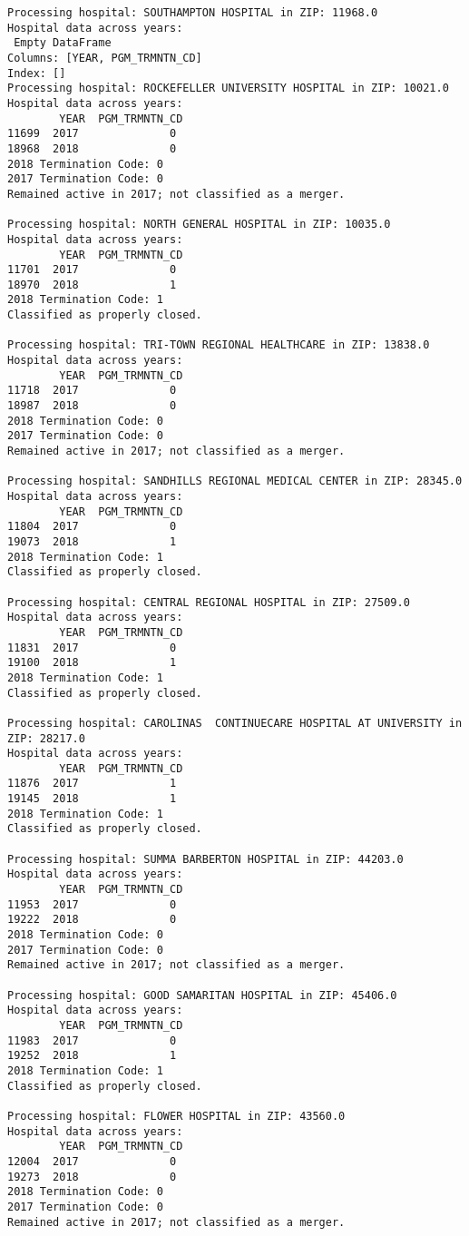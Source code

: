 \documentclass[
  letterpaper,
  DIV=11,
  numbers=noendperiod]{scrartcl}
\begin{document}
\begin{verbatim}
Processing hospital: SOUTHAMPTON HOSPITAL in ZIP: 11968.0
Hospital data across years:
 Empty DataFrame
Columns: [YEAR, PGM_TRMNTN_CD]
Index: []
Processing hospital: ROCKEFELLER UNIVERSITY HOSPITAL in ZIP: 10021.0
Hospital data across years:
        YEAR  PGM_TRMNTN_CD
11699  2017              0
18968  2018              0
2018 Termination Code: 0
2017 Termination Code: 0
Remained active in 2017; not classified as a merger.

Processing hospital: NORTH GENERAL HOSPITAL in ZIP: 10035.0
Hospital data across years:
        YEAR  PGM_TRMNTN_CD
11701  2017              0
18970  2018              1
2018 Termination Code: 1
Classified as properly closed.

Processing hospital: TRI-TOWN REGIONAL HEALTHCARE in ZIP: 13838.0
Hospital data across years:
        YEAR  PGM_TRMNTN_CD
11718  2017              0
18987  2018              0
2018 Termination Code: 0
2017 Termination Code: 0
Remained active in 2017; not classified as a merger.

Processing hospital: SANDHILLS REGIONAL MEDICAL CENTER in ZIP: 28345.0
Hospital data across years:
        YEAR  PGM_TRMNTN_CD
11804  2017              0
19073  2018              1
2018 Termination Code: 1
Classified as properly closed.

Processing hospital: CENTRAL REGIONAL HOSPITAL in ZIP: 27509.0
Hospital data across years:
        YEAR  PGM_TRMNTN_CD
11831  2017              0
19100  2018              1
2018 Termination Code: 1
Classified as properly closed.

Processing hospital: CAROLINAS  CONTINUECARE HOSPITAL AT UNIVERSITY in ZIP: 28217.0
Hospital data across years:
        YEAR  PGM_TRMNTN_CD
11876  2017              1
19145  2018              1
2018 Termination Code: 1
Classified as properly closed.

Processing hospital: SUMMA BARBERTON HOSPITAL in ZIP: 44203.0
Hospital data across years:
        YEAR  PGM_TRMNTN_CD
11953  2017              0
19222  2018              0
2018 Termination Code: 0
2017 Termination Code: 0
Remained active in 2017; not classified as a merger.

Processing hospital: GOOD SAMARITAN HOSPITAL in ZIP: 45406.0
Hospital data across years:
        YEAR  PGM_TRMNTN_CD
11983  2017              0
19252  2018              1
2018 Termination Code: 1
Classified as properly closed.

Processing hospital: FLOWER HOSPITAL in ZIP: 43560.0
Hospital data across years:
        YEAR  PGM_TRMNTN_CD
12004  2017              0
19273  2018              0
2018 Termination Code: 0
2017 Termination Code: 0
Remained active in 2017; not classified as a merger.


\end{verbatim}
\end{document}
